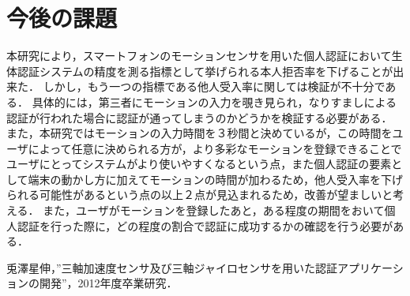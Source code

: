 \documentclass[11pt]{jarticle}
\begin{document}
\section{今後の課題}
本研究により，スマートフォンのモーションセンサを用いた個人認証において生体認証システムの精度を測る指標として挙げられる本人拒否率を下げることが出来た．
しかし，もう一つの指標である他人受入率に関しては検証が不十分である．
具体的には，第三者にモーションの入力を覗き見られ，なりすましによる認証が行われた場合に認証が通ってしまうのかどうかを検証する必要がある．
また，本研究ではモーションの入力時間を３秒間と決めているが，この時間をユーザによって任意に決められる方が，より多彩なモーションを登録できることでユーザにとってシステムがより使いやすくなるという点，また個人認証の要素として端末の動かし方に加えてモーションの時間が加わるため，他人受入率を下げられる可能性があるという点の以上２点が見込まれるため，改善が望ましいと考える．
また，ユーザがモーションを登録したあと，ある程度の期間をおいて個人認証を行った際に，どの程度の割合で認証に成功するかの確認を行う必要がある．

\begin{thebibliography}{9}
    兎澤星伸，”三軸加速度センサ及び三軸ジャイロセンサを用いた認証アプリケーションの開発”，2012年度卒業研究．
\end{thebibliography}
\end{document}
